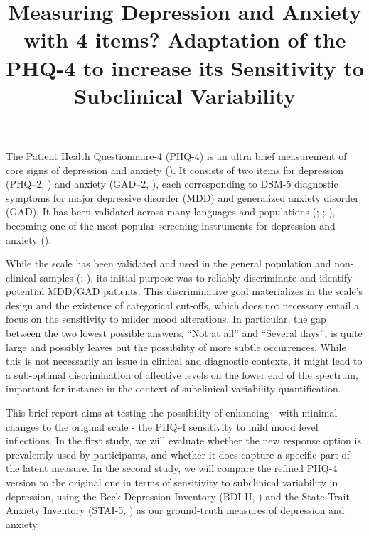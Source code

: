 \documentclass[
  man,
  floatsintext,
  longtable,
  nolmodern,
  notxfonts,
  notimes,
  colorlinks=true,linkcolor=blue,citecolor=blue,urlcolor=blue]{apa7}
\title{\textbf{Measuring Depression and Anxiety with 4 items? Adaptation
of the PHQ-4 to increase its Sensitivity to Subclinical Variability}}
\begin{document}
\maketitle


\setcounter{secnumdepth}{-\maxdimen} %

\setlength\LTleft{0pt}

\resetlinenumber[1]

The Patient Health Questionnaire-4 (PHQ-4) is an ultra brief measurement
of core signs of depression and anxiety
(). It consists of
two items for depression (PHQ--2,
) and anxiety
(GAD--2, ), each
corresponding to DSM-5 diagnostic symptoms for major depressive disorder
(MDD) and generalized anxiety disorder (GAD). It has been validated
across many languages and populations
(; ;
), becoming one of
the most popular screening instruments for depression and anxiety
().

While the scale has been validated and used in the general population
and non-clinical samples (; ), its initial
purpose was to reliably discriminate and identify potential MDD/GAD
patients. This discriminative goal materializes in the scale's design
and the existence of categorical cut-offs, which does not necessary
entail a focus on the sensitivity to milder mood alterations. In
particular, the gap between the two lowest possible answers, ``Not at
all'' and ``Several days'', is quite large and possibly leaves out the
possibility of more subtle occurrences. While this is not necessarily an
issue in clinical and diagnostic contexts, it might lead to a
sub-optimal discrimination of affective levels on the lower end of the
spectrum, important for instance in the context of subclinical
variability quantification.

This brief report aims at testing the possibility of enhancing - with
minimal changes to the original scale - the PHQ-4 sensitivity to mild
mood level inflections. In the first study, we will evaluate whether the
new response option is prevalently used by participants, and whether it
does capture a specific part of the latent measure. In the second study,
we will compare the refined PHQ-4 version to the original one in terms
of sensitivity to subclinical variability in depression, using the Beck
Depression Inventory (BDI-II, ) and the State Trait Anxiety Inventory (STAI-5,
) as our
ground-truth measures of depression and anxiety.
\end{document}
